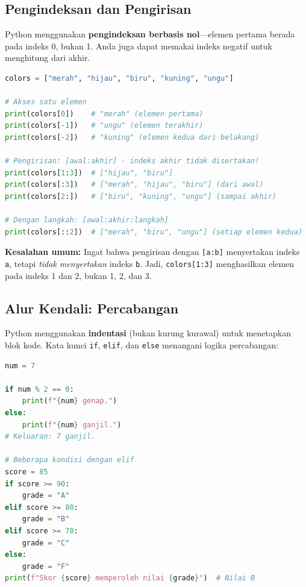 \subsection{Pengindeksan dan Pengirisan}

Python menggunakan \textbf{pengindeksan berbasis nol}---elemen pertama berada pada indeks 0, bukan 1. Anda juga dapat memakai indeks negatif untuk menghitung dari akhir.

\begin{lstlisting}[language=Python]
colors = ["merah", "hijau", "biru", "kuning", "ungu"]

# Akses satu elemen
print(colors[0])    # "merah" (elemen pertama)
print(colors[-1])   # "ungu" (elemen terakhir)
print(colors[-2])   # "kuning" (elemen kedua dari belakang)

# Pengirisan: [awal:akhir] - indeks akhir tidak disertakan!
print(colors[1:3])  # ["hijau", "biru"]
print(colors[:3])   # ["merah", "hijau", "biru"] (dari awal)
print(colors[2:])   # ["biru", "kuning", "ungu"] (sampai akhir)

# Dengan langkah: [awal:akhir:langkah]
print(colors[::2])  # ["merah", "biru", "ungu"] (setiap elemen kedua)
\end{lstlisting}

\begin{warn}
\textbf{Kesalahan umum:} Ingat bahwa pengirisan dengan \texttt{[a:b]} menyertakan indeks \texttt{a}, tetapi \emph{tidak menyertakan} indeks \texttt{b}. Jadi, \texttt{colors[1:3]} menghasilkan elemen pada indeks 1 dan 2, bukan 1, 2, dan 3.
\end{warn}

\subsection{Alur Kendali: Percabangan}

Python menggunakan \textbf{indentasi} (bukan kurung kurawal) untuk menetapkan blok kode. Kata kunci \texttt{if}, \texttt{elif}, dan \texttt{else} menangani logika percabangan:

\begin{lstlisting}[language=Python]
num = 7

if num % 2 == 0:
    print(f"{num} genap.")
else:
    print(f"{num} ganjil.")
# Keluaran: 7 ganjil.

# Beberapa kondisi dengan elif
score = 85
if score >= 90:
    grade = "A"
elif score >= 80:
    grade = "B"
elif score >= 70:
    grade = "C"
else:
    grade = "F"
print(f"Skor {score} memperoleh nilai {grade}")  # Nilai B
\end{lstlisting}

